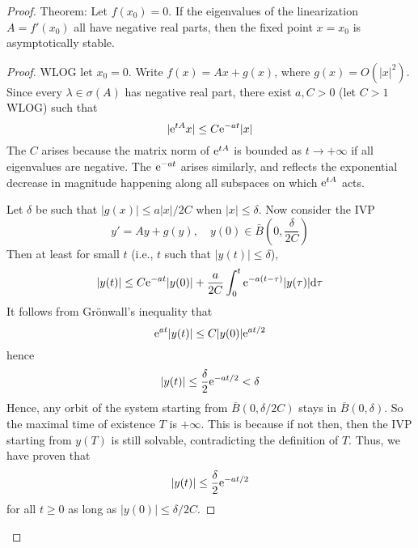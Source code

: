 \documentclass[../psets.tex]{subfiles}
\begin{document}
\begin{enumerate}
\begin{proof}
        Theorem: Let $f(x_0)=0$. If the eigenvalues of the linearization $A=f'(x_0)$ all have negative real parts, then the fixed point $x=x_0$ is asymptotically stable.
        \begin{proof}
            WLOG let $x_0=0$. Write $f(x)=Ax+g(x)$, where $g(x)=O(|x|^2)$. Since every $\lambda\in\sigma(A)$ has negative real part, there exist $a,C>0$ (let $C>1$ WLOG) such that
            \begin{equation*}
                |\e[tA]x| \leq C\e[-at]|x|
            \end{equation*}
            The $C$ arises because the matrix norm of $\e[tA]$ is bounded as $t\to +\infty$ if all eigenvalues are negative. The $\e[-at]$ arises similarly, and reflects the exponential decrease in magnitude happening along all subspaces on which $\e[tA]$ acts.\par
            Let $\delta$ be such that $|g(x)|\leq a|x|/2C$ when $|x|\leq\delta$. Now consider the IVP
            \begin{equation*}
                y' = Ay+g(y)
                ,\quad
                y(0) \in \bar{B}\left( 0,\frac{\delta}{2C} \right)
            \end{equation*}
            Then at least for small $t$ (i.e., $t$ such that $|y(t)|\leq\delta$),
            \begin{equation*}
                |y(t)| \leq C\e[-at]|y(0)|+\frac{a}{2C}\int_0^t\e[-a(t-\tau)]|y(\tau)|\dd\tau
            \end{equation*}
            It follows from Gr\"{o}nwall's inequality that
            \begin{equation*}
                \e[at]|y(t)| \leq C|y(0)|\e[at/2]
            \end{equation*}
            hence
            \begin{equation*}
                |y(t)| \leq \frac{\delta}{2}\e[-at/2]
                < \delta
            \end{equation*}
            Hence, any orbit of the system starting from $\bar{B}(0,\delta/2C)$ stays in $\bar{B}(0,\delta)$. So the maximal time of existence $T$ is $+\infty$. This is because if not then, then the IVP starting from $y(T)$ is still solvable, contradicting the definition of $T$. Thus, we have proven that
            \begin{equation*}
                |y(t)| \leq \frac{\delta}{2}\e[-at/2]
            \end{equation*}
            for all $t\geq 0$ as long as $|y(0)|\leq\delta/2C$.

\end{proof}
\end{proof}
\end{enumerate}
\end{document}
